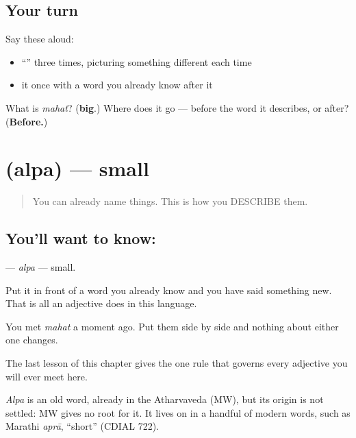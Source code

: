 \subsection*{Your turn}
Say these aloud:

\begin{itemize}
\raggedright
  \item \textquotedblleft{}\textquotedblright{} three times, picturing something different each time
  \item it once with a word you already know after it
\end{itemize}

\begin{tcolorbox}[breakable,colback=teal!4,colframe=teal!35!black,title={Before you move on}]
What is \emph{mahat}? (\textbf{big}.) Where does it go — before the word it describes, or after? (\textbf{Before.})
\end{tcolorbox}
\section[\texorpdfstring{\sk{अल्प} (alpa)}{अल्प (alpa)}]{ (alpa) — small}

\label{lesson:SA-C15-small}



\begin{quote}
You can already name things. This is how you DESCRIBE them.
\end{quote}

\subsection*{You'll want to know: }
\textbf{} — \emph{alpa} — small.

Put it in front of a word you already know and you have said something new. That is all an adjective does in this language.

You met \textbf{} \emph{mahat} a moment ago. Put them side by side and nothing about either one changes.

The last lesson of this chapter gives the one rule that governs every adjective you will ever meet here.

\begin{cousinweb}
\emph{Alpa} is an old word, already in the Atharvaveda (MW), but its origin is not settled: MW gives no root for it. It lives on in a handful of modern words, such as Marathi \emph{aprā}, \textquotedblleft{}short\textquotedblright{} (CDIAL 722).
\end{cousinweb}

